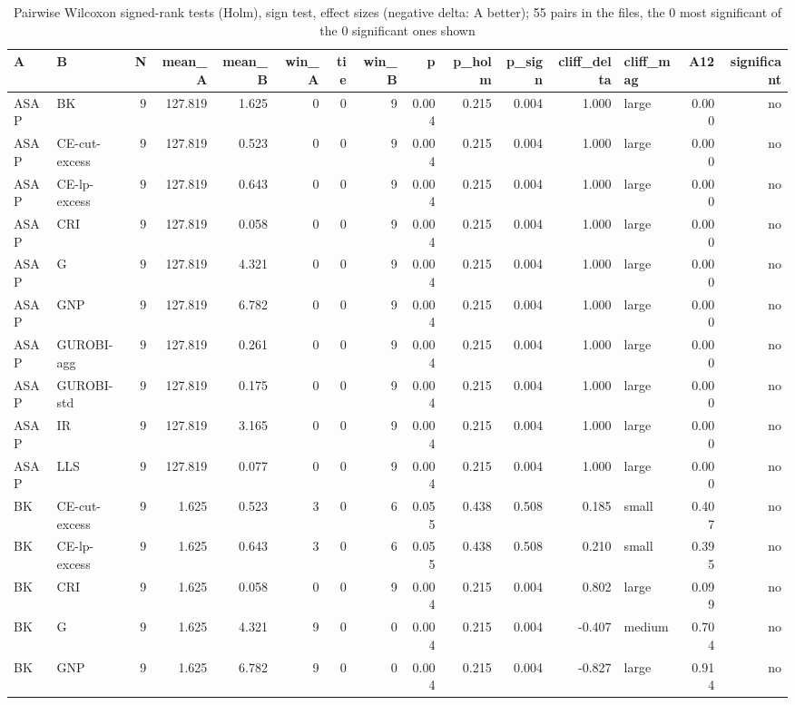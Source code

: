\begin{table}[htbp]
\centering
\small
\caption{Pairwise Wilcoxon signed-rank tests (Holm), sign test, effect sizes (negative delta: A better); 55 pairs in the files, the 0 most significant of the 0 significant ones shown}
\label{tab:E6_scalability_b120_pairwise}
\begin{tabular}{llrrrrrrrrrrlrr}
\toprule
A & B & N & mean\_A & mean\_B & win\_A & tie & win\_B & p & p\_holm & p\_sign & cliff\_delta & cliff\_mag & A12 & significant \\
\midrule
ASAP & BK & 9 & 127.819 & 1.625 & 0 & 0 & 9 & 0.004 & 0.215 & 0.004 & 1.000 & large & 0.000 & no \\
ASAP & CE-cut-excess & 9 & 127.819 & 0.523 & 0 & 0 & 9 & 0.004 & 0.215 & 0.004 & 1.000 & large & 0.000 & no \\
ASAP & CE-lp-excess & 9 & 127.819 & 0.643 & 0 & 0 & 9 & 0.004 & 0.215 & 0.004 & 1.000 & large & 0.000 & no \\
ASAP & CRI & 9 & 127.819 & 0.058 & 0 & 0 & 9 & 0.004 & 0.215 & 0.004 & 1.000 & large & 0.000 & no \\
ASAP & G & 9 & 127.819 & 4.321 & 0 & 0 & 9 & 0.004 & 0.215 & 0.004 & 1.000 & large & 0.000 & no \\
ASAP & GNP & 9 & 127.819 & 6.782 & 0 & 0 & 9 & 0.004 & 0.215 & 0.004 & 1.000 & large & 0.000 & no \\
ASAP & GUROBI-agg & 9 & 127.819 & 0.261 & 0 & 0 & 9 & 0.004 & 0.215 & 0.004 & 1.000 & large & 0.000 & no \\
ASAP & GUROBI-std & 9 & 127.819 & 0.175 & 0 & 0 & 9 & 0.004 & 0.215 & 0.004 & 1.000 & large & 0.000 & no \\
ASAP & IR & 9 & 127.819 & 3.165 & 0 & 0 & 9 & 0.004 & 0.215 & 0.004 & 1.000 & large & 0.000 & no \\
ASAP & LLS & 9 & 127.819 & 0.077 & 0 & 0 & 9 & 0.004 & 0.215 & 0.004 & 1.000 & large & 0.000 & no \\
BK & CE-cut-excess & 9 & 1.625 & 0.523 & 3 & 0 & 6 & 0.055 & 0.438 & 0.508 & 0.185 & small & 0.407 & no \\
BK & CE-lp-excess & 9 & 1.625 & 0.643 & 3 & 0 & 6 & 0.055 & 0.438 & 0.508 & 0.210 & small & 0.395 & no \\
BK & CRI & 9 & 1.625 & 0.058 & 0 & 0 & 9 & 0.004 & 0.215 & 0.004 & 0.802 & large & 0.099 & no \\
BK & G & 9 & 1.625 & 4.321 & 9 & 0 & 0 & 0.004 & 0.215 & 0.004 & -0.407 & medium & 0.704 & no \\
BK & GNP & 9 & 1.625 & 6.782 & 9 & 0 & 0 & 0.004 & 0.215 & 0.004 & -0.827 & large & 0.914 & no \\

\end{tabular}
\end{table}
